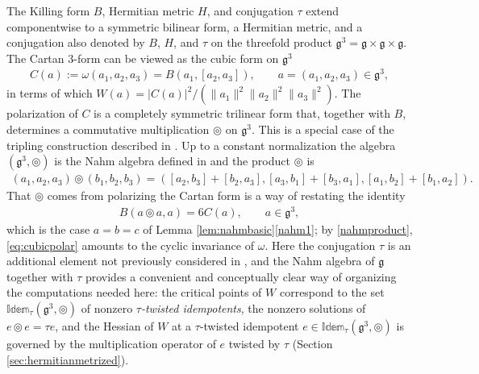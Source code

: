 \documentclass [leqno, 10pt]{amsart}
\theoremstyle{definition}
\numberwithin{equation}{section}
\newcommand{\idem}{\mathbb{Idem}}
\newcommand{\tmlt}{\circledcirc}
\newcommand{\om}{\omega}
\newcommand{\g}{\mathfrak{g}}
\newcommand{\norm}[1]{\lVert #1\rVert}
\begin{document}
The Killing form $B$, Hermitian metric $H$, and conjugation $\tau$ extend componentwise to a symmetric bilinear form, a Hermitian metric, and a conjugation also denoted by $B$, $H$, and $\tau$ on the threefold product $\g^{3} = \g \times \g \times \g$. The Cartan $3$-form can be viewed as the cubic form on $\g^{3}$
\begin{align}\label{eq:cubic}
C(a) := \om(a_{1}, a_{2}, a_{3}) = B(a_{1}, [a_{2}, a_{3}]), \qquad a = (a_{1}, a_{2}, a_{3}) \in \g^{3},
\end{align}
in terms of which $W(a) = |C(a)|^{2}/(\norm{a_{1}}^{2}\norm{a_{2}}^{2}\norm{a_{3}}^{2})$. The polarization of $C$ is a completely symmetric trilinear form that, together with $B$, determines a commutative multiplication $\tmlt$ on $\g^{3}$. This is a special case of the tripling construction described in \cite{Fox-cubicpoly, Fox-Tkachev}. Up to a constant normalization the algebra $(\g^{3}, \tmlt)$ is the Nahm algebra defined in \cite{Kinyon-Sagle} and the product $\tmlt$ is \begin{align}\label{nahmproduct}
(a_{1}, a_{2}, a_{3})\tmlt (b_{1}, b_{2}, b_{3}) = ([a_{2}, b_{3}] + [b_{2}, a_{3}],[a_{3}, b_{1}] + [b_{3}, a_{1}] ,[a_{1}, b_{2}] + [b_{1}, a_{2}] ).
\end{align}
That $\tmlt$ comes from polarizing the Cartan form is a way of restating the identity
\begin{align}\label{eq:cubicpolar}
B(a\tmlt a, a) = 6C(a), \qquad a \in \g^{3},
\end{align}
which is the case $a = b = c$ of Lemma \ref{lem:nahmbasic}\ref{nahm1}; by \eqref{nahmproduct}, \eqref{eq:cubicpolar} amounts to the cyclic invariance of $\om$.
Here the conjugation $\tau$ is an additional element not previously considered in \cite{Fox-Tkachev, Kinyon-Sagle}, and the Nahm algebra of $\g$ together with $\tau$ provides a convenient and conceptually clear way of organizing the computations needed here: the critical points of $W$ correspond to the set $\idem_{\tau}(\g^{3}, \tmlt)$ of nonzero \emph{$\tau$-twisted idempotents}, the nonzero solutions of $e \tmlt e = \tau e$, and the Hessian of $W$ at a $\tau$-twisted idempotent $e \in \idem_{\tau}(\g^{3}, \tmlt)$ is governed by the multiplication operator of $e$ twisted by $\tau$ (Section \ref{sec:hermitianmetrized}).
\end{document}
